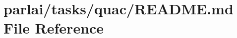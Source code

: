 \hypertarget{parlai_2tasks_2quac_2README_8md}{}\section{parlai/tasks/quac/\+R\+E\+A\+D\+ME.md File Reference}
\label{parlai_2tasks_2quac_2README_8md}
